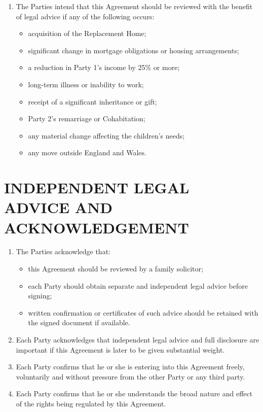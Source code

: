 \documentclass[10pt,a4paper]{article}
\begin{document}
\begin{enumerate}[label=\arabic*., start=62, leftmargin=1.8em]
    \item The Parties intend that this Agreement should be reviewed with the benefit of legal advice if any of the following occurs:
    \begin{itemize}[leftmargin=1.8em]
        \item acquisition of the Replacement Home;
        \item significant change in mortgage obligations or housing arrangements;
        \item a reduction in Party 1's income by 25\% or more;
        \item long-term illness or inability to work;
        \item receipt of a significant inheritance or gift;
        \item Party 2's remarriage or Cohabitation;
        \item any material change affecting the children's needs;
        \item any move outside England and Wales.
    \end{itemize}
\end{enumerate}

\section*{INDEPENDENT LEGAL ADVICE AND ACKNOWLEDGEMENT}

\begin{enumerate}[label=\arabic*., start=63, leftmargin=1.8em]
    \item The Parties acknowledge that:
    \begin{itemize}[leftmargin=1.8em]
        \item this Agreement should be reviewed by a family solicitor;
        \item each Party should obtain separate and independent legal advice before signing;
        \item written confirmation or certificates of such advice should be retained with the signed document if available.
    \end{itemize}
    \item Each Party acknowledges that independent legal advice and full disclosure are important if this Agreement is later to be given substantial weight.
    \item Each Party confirms that he or she is entering into this Agreement freely, voluntarily and without pressure from the other Party or any third party.
    \item Each Party confirms that he or she understands the broad nature and effect of the rights being regulated by this Agreement.
\end{enumerate}
\end{document}
